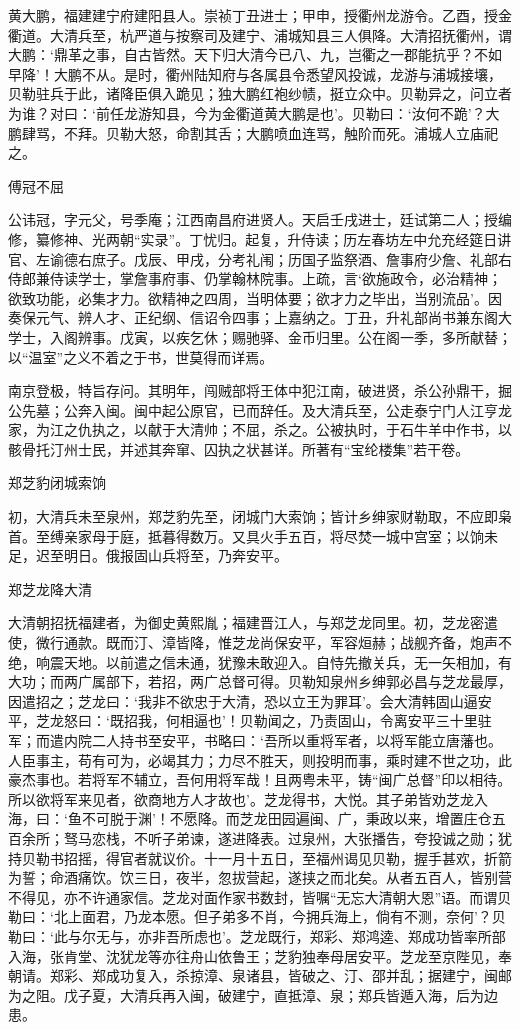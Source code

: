 \documentclass[]{article}
\begin{document}
黄大鹏，福建建宁府建阳县人。崇祯丁丑进士；甲申，授衢州龙游令。乙酉，授金衢道。大清兵至，杭严道与按察司及建宁、浦城知县三人俱降。大清招抚衢州，谓大鹏：`鼎革之事，自古皆然。天下归大清今已八、九，岂衢之一郡能抗乎？不如早降'！大鹏不从。是时，衢州陆知府与各属县令悉望风投诚，龙游与浦城接壤，贝勒驻兵于此，诸降臣俱入跪见；独大鹏红袍纱帻，挺立众中。贝勒异之，问立者为谁？对曰：`前任龙游知县，今为金衢道黄大鹏是也'。贝勒曰：`汝何不跪'？大鹏肆骂，不拜。贝勒大怒，命割其舌；大鹏喷血连骂，触阶而死。浦城人立庙祀之。

傅冠不屈

公讳冠，字元父，号季庵；江西南昌府进贤人。天启壬戌进士，廷试第二人；授编修，纂修神、光两朝``实录''。丁忧归。起复，升侍读；历左春坊左中允充经筵日讲官、左谕德右庶子。戊辰、甲戌，分考礼闱；历国子监祭酒、詹事府少詹、礼部右侍郎兼侍读学士，掌詹事府事、仍掌翰林院事。上疏，言`欲施政令，必治精神；欲致功能，必集才力。欲精神之四周，当明体要；欲才力之毕出，当别流品'。因奏保元气、辨人才、正纪纲、信诏令四事；上嘉纳之。丁丑，升礼部尚书兼东阁大学士，入阁辨事。戊寅，以疾乞休；赐驰驿、金币归里。公在阁一季，多所献替；以``温室''之义不着之于书，世莫得而详焉。

南京登极，特旨存问。其明年，闯贼部将王体中犯江南，破进贤，杀公孙鼎干，掘公先墓；公奔入闽。闽中起公原官，已而辞任。及大清兵至，公走泰宁门人江亨龙家，为江之仇执之，以献于大清帅；不屈，杀之。公被执时，于石牛羊中作书，以骸骨托汀州士民，并述其奔窜、囚执之状甚详。所著有``宝纶楼集''若干卷。

郑芝豹闭城索饷

初，大清兵未至泉州，郑芝豹先至，闭城门大索饷；皆计乡绅家财勒取，不应即枭首。至缚亲家母于庭，抵暮得数万。又具火手五百，将尽焚一城中宫室；以饷未足，迟至明日。俄报固山兵将至，乃奔安平。

郑芝龙降大清

大清朝招抚福建者，为御史黄熙胤；福建晋江人，与郑芝龙同里。初，芝龙密遣使，微行通款。既而汀、漳皆降，惟芝龙尚保安平，军容烜赫；战舰齐备，炮声不绝，响震天地。以前遣之信未通，犹豫未敢迎入。自恃先撤关兵，无一矢相加，有大功；而两广属部下，若招，两广总督可得。贝勒知泉州乡绅郭必昌与芝龙最厚，因遣招之；芝龙曰：`我非不欲忠于大清，恐以立王为罪耳'。会大清韩固山逼安平，芝龙怒曰：`既招我，何相逼也'！贝勒闻之，乃责固山，令离安平三十里驻军；而遣内院二人持书至安平，书略曰：`吾所以重将军者，以将军能立唐藩也。人臣事主，苟有可为，必竭其力；力尽不胜天，则投明而事，乘时建不世之功，此豪杰事也。若将军不辅立，吾何用将军哉！且两粤未平，铸``闽广总督''印以相待。所以欲将军来见者，欲商地方人才故也'。芝龙得书，大悦。其子弟皆劝芝龙入海，曰：`鱼不可脱于渊'！不愿降。而芝龙田园遍闽、广，秉政以来，增置庄仓五百余所；驽马恋栈，不听子弟谏，遂进降表。过泉州，大张播告，夸投诚之勋；犹持贝勒书招摇，得官者就议价。十一月十五日，至福州谒见贝勒，握手甚欢，折箭为誓；命酒痛饮。饮三日，夜半，忽拔营起，遂挟之而北矣。从者五百人，皆别营不得见，亦不许通家信。芝龙对面作家书数封，皆嘱``无忘大清朝大恩''语。而谓贝勒曰：`北上面君，乃龙本愿。但子弟多不肖，今拥兵海上，倘有不测，奈何'？贝勒曰：`此与尔无与，亦非吾所虑也'。芝龙既行，郑彩、郑鸿逵、郑成功皆率所部入海，张肯堂、沈犹龙等亦往舟山依鲁王；芝豹独奉母居安平。芝龙至京陛见，奉朝请。郑彩、郑成功复入，杀掠漳、泉诸县，皆破之、汀、邵并乱；据建宁，闽邮为之阻。戊子夏，大清兵再入闽，破建宁，直抵漳、泉；郑兵皆遁入海，后为边患。
\end{document}
